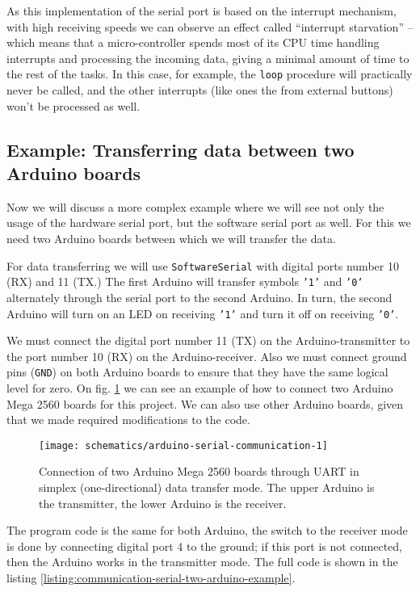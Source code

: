\documentclass[../sparc.tex]{subfiles}
\begin{document}
As this implementation of the serial port is based on the interrupt mechanism,
with high receiving speeds we can observe an effect called ``interrupt
starvation'' -- which means that a micro-controller spends most of its CPU time
handling interrupts and processing the incoming data, giving a minimal amount of
time to the rest of the tasks.  In this case, for example, the \texttt{loop}
procedure will practically never be called, and the other interrupts (like ones
the from external buttons) won't be processed as well.

\subsection{Example: Transferring data between two Arduino boards}

Now we will discuss a more complex example where we will see not only the usage
of the hardware serial port, but the software serial port as well.  For this we
need two Arduino boards between which we will transfer the data.

For data transferring we will use \texttt{SoftwareSerial} with digital ports
number 10 (RX) and 11 (TX.)  The first Arduino will transfer symbols
\texttt{'1'} and \texttt{'0'} alternately through the serial port to the second
Arduino.  In turn, the second Arduino will turn on an LED on receiving
\texttt{'1'} and turn it off on receiving \texttt{'0'}.

We must connect the digital port number 11 (TX) on the Arduino-transmitter to
the port number 10 (RX) on the Arduino-receiver.  Also we must connect ground
pins (\texttt{GND}) on both Arduino boards to ensure that they have the same
logical level for zero.  On fig. \ref{fig:arduino-serial-communication-1} we can
see an example of how to connect two Arduino Mega 2560 boards for this project.
We can also use other Arduino boards, given that we made required modifications
to the code.

\begin{figure}[H]
  \centering
  \texttt{[image: schematics/arduino-serial-communication-1]}
  \caption{Connection of two Arduino Mega 2560 boards through UART in simplex
    (one-directional) data transfer mode.  The upper Arduino is the transmitter,
    the lower Arduino is the receiver.}
  \label{fig:arduino-serial-communication-1}
\end{figure}

The program code is the same for both Arduino, the switch to the receiver mode
is done by connecting digital port 4 to the ground; if this port is not
connected, then the Arduino works in the transmitter mode. The full code is
shown in the listing \ref{listing:communication-serial-two-arduino-example}.
\end{document}
